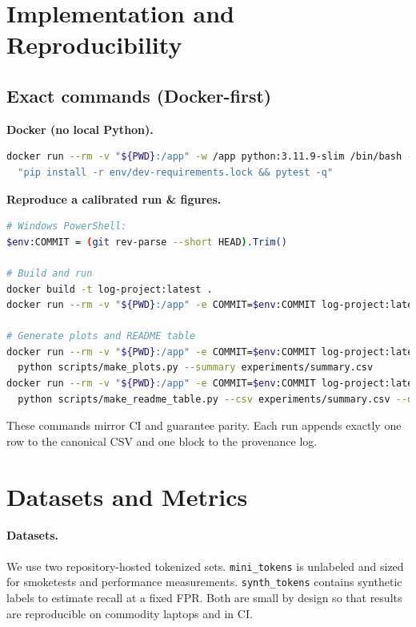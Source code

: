 \documentclass[10pt,twocolumn]{article}
\begin{document}
\section{Implementation and Reproducibility}

\subsection*{Exact commands (Docker-first)}

\noindent\textbf{Docker (no local Python).}
\begin{lstlisting}[language=bash]
docker run --rm -v "${PWD}:/app" -w /app python:3.11.9-slim /bin/bash -lc \
  "pip install -r env/dev-requirements.lock && pytest -q"
\end{lstlisting}

\noindent\textbf{Reproduce a calibrated run \& figures.}
\begin{lstlisting}[language=bash]
# Windows PowerShell:
$env:COMMIT = (git rev-parse --short HEAD).Trim()

# Build and run
docker build -t log-project:latest .
docker run --rm -v "${PWD}:/app" -e COMMIT=$env:COMMIT log-project:latest

# Generate plots and README table
docker run --rm -v "${PWD}:/app" -e COMMIT=$env:COMMIT log-project:latest \
  python scripts/make_plots.py --summary experiments/summary.csv
docker run --rm -v "${PWD}:/app" -e COMMIT=$env:COMMIT log-project:latest \
  python scripts/make_readme_table.py --csv experiments/summary.csv --out README_TABLE.txt
\end{lstlisting}

\noindent These commands mirror CI and guarantee parity. Each run appends exactly one row to the canonical CSV and one block to the provenance log.

\section{Datasets and Metrics}

\paragraph{Datasets.} We use two repository-hosted tokenized sets. \texttt{mini\_tokens} is unlabeled and sized for smoketests and performance measurements. \texttt{synth\_tokens} contains synthetic labels to estimate recall at a fixed FPR. Both are small by design so that results are reproducible on commodity laptops and in CI.
\end{document}
